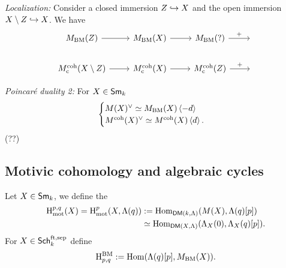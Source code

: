 \emph{Localization:} Consider a closed immersion $Z\hookrightarrow X$ and the open immersion $X\setminus Z\hookrightarrow X$. We have
\[
\begin{tikzcd}
	M_{\text{BM}}(Z) \ar[r] & M_{\text{BM}}(X) \ar[r] & M_{\text{BM}}(?) \ar[r,"+"] & {} \\
	M^{\text{coh}}_{\text{c}}(X\setminus Z) \ar[r] & M^{\text{coh}}_{\text{c}}(X) \ar[r] & M^{\text{coh}}_{\text{c}}(Z) \ar[r,"+"] & {}
\end{tikzcd}
\]

\emph{Poincar\'e duality 2:} For $X\in \mathsf{Sm}_k$
\[
\begin{cases}
	M(X)^{\vee} \simeq M_{\text{BM}}(X)\left<-d \right> \\
	M^{\text{coh}}(X)^{\vee} \simeq M^{\text{coh}}(X)\left<d \right>.
\end{cases}
\] 
(??)

\subsection{Motivic cohomology and algebraic cycles}
\begin{definition}
	Let $X\in \mathsf{Sm}_k$, we define the 
	\begin{align*}
		\mathrm{H}_{\text{mot}}^{p,q}(X) = \mathrm{H}_{\text{mot}}^{p}(X,\Lambda(q)) &:= \operatorname{Hom}_{\mathsf{DM}(k,\Lambda)}(M(X), \Lambda(q)[p]) \\
									       &\simeq \operatorname{Hom}_{\mathsf{DM}(X,\Lambda)}(\Lambda_X(0), \Lambda_X(q)[p]).
	\end{align*}
	For $X\in \mathsf{Sch}_k^{\text{ft,sep}}$ define
	\[
		\mathrm{H}_{p,q}^{\text{BM}} := \operatorname{Hom}(\Lambda(q)[p], M_{\text{BM}}(X)).
	\] 
\end{definition}
